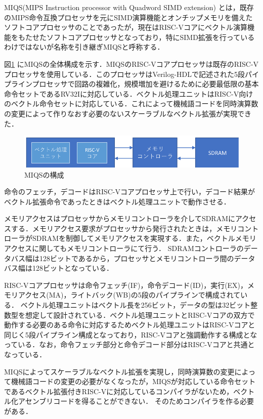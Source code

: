 MIQS(MIPS Instruction processor with Quadword SIMD extension)\cite{bib:hiraishi}
とは，既存のMIPS命令互換プロセッサを元にSIMD演算機能とオンチップメモリを備えたソフトコアプロセッサのことであったが，現在はRISC-Vコアにベクトル演算機能をもたせたソフトコアプロセッサとなっており，特にSIMD拡張を行っているわけではないが名称を引き継ぎMIQSと呼称する．

図\ref{fig:MIQS_system}
にMIQSの全体構成を示す．MIQSのRISC-Vコアプロセッサは既存のRISC-Vプロセッサを使用している．このプロセッサはVerilog-HDLで記述された5段パイプラインプロセッサで回路の複雑化，規模増加を避けるために必要最低限の基本命令セットであるRV32Iに対応している．ベクトル処理ユニットはRISC-V向けのベクトル命令セットに対応している．これによって機械語コードを同時演算数の変更によって作りなおす必要のないスケーラブルなベクトル拡張が実現できた．

\begin{figure}[b]
\begin{center}
    \includegraphics[scale=1.0]{image/MIQS_system.pdf}
    \caption{MIQSの構成}
    \label{fig:MIQS_system}
\end{center}
\end{figure}

命令のフェッチ，デコードはRISC-Vコアプロセッサ上で行い，デコード結果がベクトル拡張命令であったときはベクトル処理ユニットで動作させる．

メモリアクセスはプロセッサからメモリコントローラを介してSDRAMにアクセスする．メモリアクセス要求がプロセッサから発行されたときは，メモリコントローラがSDRAMを制御してメモリアクセスを実現する．また，ベクトルメモリアクセスに関してもメモリコントローラにて行う．
SDRAMコントローラのデータバス幅は128ビットであるから，プロセッサとメモリコントローラ間のデータバス幅は128ビットとなっている．

RISC-Vコアプロセッサは命令フェッチ(IF)，命令デコード(ID)，実行(EX)，メモリアクセス(MA)，ライトバック(WB)の5段のパイプラインで構成されている．
ベクトル処理ユニットはベクトル長を256ビット，データの型は32ビット整数型を想定して設計されている．ベクトル処理ユニットとRISC-Vコアの双方で動作する必要のある命令に対応するためベクトル処理ユニットはRISC-Vコアと同じく5段パイプライン構成となっており，RISC-Vコアと強調動作する構成となっている．なお，命令フェッチ部分と命令デコード部分はRISC-Vコアと共通となっている．

MIQSによってスケーラブルなベクトル拡張を実現し，同時演算数の変更によって機械語コードの変更の必要がなくなったが，MIQSが対応している命令セットであるベクトル拡張付きRISC-Vに対応しているコンパイラがないため，ベクトル化アセンブリコードを得ることができない．
そのためコンパイラを作る必要がある．